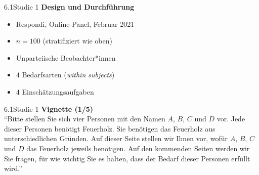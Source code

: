 \documentclass[xcolor=table,9pt,aspectratio=169]{beamer}
\begin{document}
\begin{frame}{\vspace*{10mm}6.1\hspace*{1em}Studie 1}
\textbf{Design und Durchführung}\\
\medskip
\begin{itemize}
   \item Respondi, Online-Panel, Februar 2021
   \item $n=100$ (stratifiziert wie oben)
   \item Unparteiische Beobachter*innen
   \item $4$ Bedarfsarten (\textit{within subjects})
   \item $4$ Einschätzungsaufgaben
\end{itemize}
\end{frame}


\begin{frame}{\vspace*{10mm}6.1\hspace*{1em}Studie 1}
\textbf{Vignette (1/5)}\\
\medskip
\enquote{Bitte stellen Sie sich vier Personen mit den Namen $A$, $B$, $C$ und $D$ vor. Jede dieser Personen benötigt Feuerholz. Sie benötigen das Feuerholz aus unterschiedlichen Gründen. Auf dieser Seite stellen wir Ihnen vor, wofür $A$, $B$, $C$ und $D$ das Feuerholz jeweils benötigen. Auf den kommenden Seiten werden wir Sie fragen, für wie wichtig Sie es halten, dass der Bedarf dieser Personen erfüllt wird.}
\end{frame}
\end{document}
